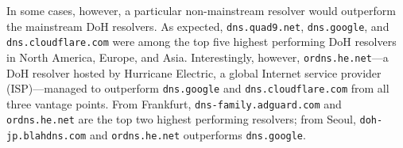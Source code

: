 In some cases, however, a particular non-mainstream resolver would outperform
the mainstream DoH resolvers.  As expected, \texttt{dns.quad9.net},
\texttt{dns.google}, and \texttt{dns.cloudflare.com} were among the top five
highest performing DoH resolvers in North America, Europe, and Asia.
Interestingly, however, \texttt{ordns.he.net}---a DoH resolver hosted by
Hurricane Electric, a global Internet service provider (ISP)---managed to
outperform \texttt{dns.google} and \texttt{dns.cloudflare.com} from all three
vantage points.  From Frankfurt, \texttt{dns-family.adguard.com} and
\texttt{ordns.he.net} are the top two highest performing resolvers; from
Seoul, \texttt{doh-jp.blahdns.com} and \texttt{ordns.he.net} outperforms \texttt{dns.google}.

\begin{figure}[t!]
\hspace*{-1in}
\begin{minipage}{1.35\textwidth}
\centering
{}%
\hfill%
\hfill%
%

\end{minipage}
\end{figure}
